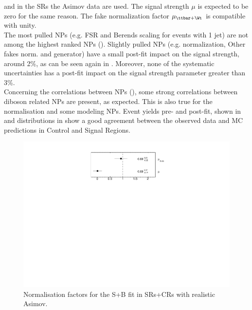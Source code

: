 and in the SRs the Asimov data are used. 
The signal strength $\mu$ is expected to be zero for the same reason.
The fake normalization factor $\mu_{\ttbar+\Wt}$ is compatible with unity.\\
The most pulled NPs (e.g. \ttbar FSR and \VVHF Berends scaling for events with 1 jet) are
not among the highest ranked NPs (). 
Slightly pulled NPs (e.g. \ttZ normalization, Other fakes norm. and \VVHF generator) have a small post-fit impact on the signal strength, around 2\%, as can be seen again in . Moreover, none of the systematic uncertainties has a post-fit impact on the signal strength parameter greater than 3\%.\\
Concerning the correlations between NPs
(), some strong correlations
between diboson related NPs are present, as expected. This is also
true for the \ttbar normalisation and some \ttbar modeling NPs. 
Event yields pre- and post-fit, shown in  and distributions in  show a good agreement between the observed data and MC predictions in Control and Signal Regions.

\begin{figure}[htbp]
	\centering
	\includegraphics[width=.5\textwidth]{Chapters/CH8/figures/SPLUSB_CRSR_UsingDL1rcFullSys/NormFactors}
	\caption{Normalisation factors for the S+B \tZc fit in SRs+CRs with realistic Asimov.}%
	\label{fig:stat:tzc:splusb:crsr:norm}
\end{figure}

